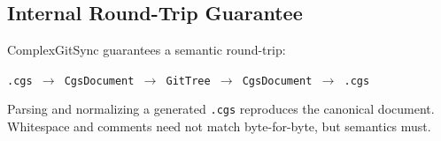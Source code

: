 \subsection{Internal Round-Trip Guarantee}
\label{subsec:cgs-roundtrip}

ComplexGitSync guarantees a semantic round-trip:

\begin{center}
\texttt{.cgs $\rightarrow$ CgsDocument $\rightarrow$ GitTree $\rightarrow$ CgsDocument $\rightarrow$ .cgs}
\end{center}

Parsing and normalizing a generated \texttt{.cgs} reproduces the canonical document.
Whitespace and comments need not match byte-for-byte, but semantics must.
